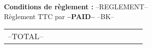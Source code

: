 \documentclass[a4paper, oneside, 10pt, french]{article}
\newcommand{\ghline}{\arrayrulecolor{gray}\hline\arrayrulecolor{black}}
\begin{document}
\begin{minipage}[t]{0.48\textwidth}
{\footnotesize \textbf{Conditions de règlement :} --REGLEMENT--}\\
{\footnotesize Règlement TTC par \textbf{--PAID--} --BK--}\\
\end{minipage}
\hspace{2mm}
\begin{minipage}[t]{0.50\textwidth}
\begin{flushright}
\begin{tabular}{p{4.5cm} r}
--TOTAL--
\rowcolor{violet}\textcolor{white}{NET à payer} &\textcolor{white}{--APAYER--} \\ 
\end{tabular} 
\end{flushright}
\end{minipage}


\end{document}
